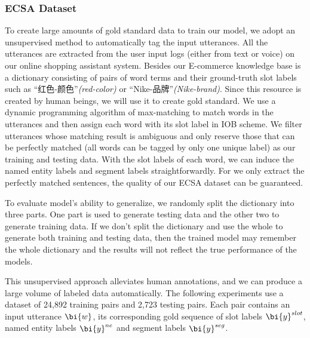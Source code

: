 \subsubsection{ECSA Dataset}
\label{sec:ECSGA_data}
To create large amounts of gold standard data 
to train our model,
we adopt an unsupervised method to 
automatically tag the input utterances.
All the utterances are extracted from the user input logs 
(either from text or voice) on our online shopping 
assistant system. Besides our E-commerce knowledge base
is a dictionary consisting of pairs of
word terms and their ground-truth slot labels 
such as ``红色-颜色''\emph{(red-color)} or ``Nike-品牌''\emph{(Nike-brand)}.
Since this resource is created by human beings,
we will use it to create gold standard.
We use a dynamic programming algorithm of max-matching to 
match words in the utterances and then assign each word with 
its slot label in IOB scheme.
We filter utterances whose matching result is
ambiguous and only reserve those that can be 
perfectly matched
(all words can be tagged by only one unique label) 
as our training and testing data.
With the slot labels of each word, we can induce the 
named entity labels and segment labels straightforwardly.
For we only extract the perfectly matched sentences,
the quality of our ECSA dataset can be guaranteed.

To evaluate model's ability to generalize, 
we randomly split the dictionary into three parts.
One part is used to generate testing data and the other two 
to generate training data.
If we don't split the dictionary and use the whole to generate 
both training and testing data,
then the trained model may remember the whole dictionary and 
the results will not reflect the true performance of the models.

This unsupervised approach 
alleviates human annotations, 
and we can produce a large volume of labeled data automatically. 
The following experiments use a dataset of 24,892 training pairs
and 2,723 testing pairs.
Each pair contains an input utterance $\bi{w}$, 
its corresponding gold sequence of slot labels $\bi{y}^{slot}$,
named entity labels $\bi{y}^{ne}$ and segment labels $\bi{y}^{seg}$.

